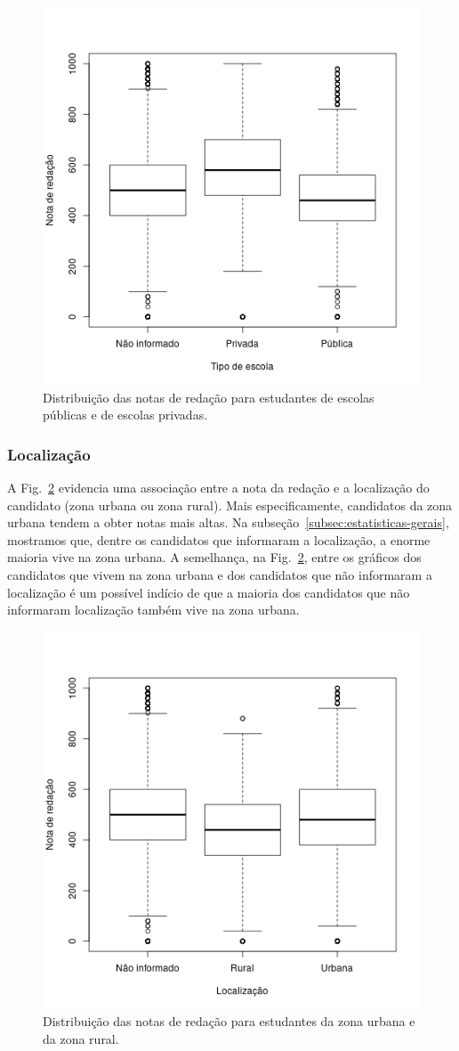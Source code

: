 \documentclass[12pt]{article}
\newcommand{\reffig}[1]{Fig.~\ref{fig:#1}}
\begin{document}
\begin{figure}[H]
\centering\includegraphics[width=.5\linewidth]{../correlacao_escola.png}
\caption{Distribuição das notas de redação para estudantes de escolas públicas e de escolas privadas.}
\label{fig:correlacao-escola}
\end{figure}

\subsubsection{Localização}
A \reffig{correlacao-localizacao} evidencia uma associação entre a nota da redação e a localização do candidato (zona urbana ou zona rural).
Mais especificamente, candidatos da zona urbana tendem a obter notas mais altas.
Na subseção~\ref{subsec:estatisticas-gerais}, mostramos que, dentre os candidatos que informaram a localização, a enorme maioria vive na zona urbana.
A semelhança, na \reffig{correlacao-localizacao}, entre os gráficos dos candidatos que vivem na zona urbana e dos candidatos que não informaram a localização é um possível indício de que a maioria dos candidatos que não informaram localização também vive na zona urbana.

\begin{figure}[H]
\centering\includegraphics[width=.44\linewidth]{../correlacao_localizacao.png}
\caption{Distribuição das notas de redação para estudantes da zona urbana e da zona rural.}
\label{fig:correlacao-localizacao}
\end{figure}
\end{document}
